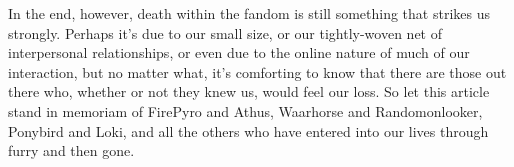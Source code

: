 In the end, however, death within the fandom is still something that strikes us strongly. Perhaps it's due to our small size, or our tightly-woven net of interpersonal relationships, or even due to the online nature of much of our interaction, but no matter what, it's comforting to know that there are those out there who, whether or not they knew us, would feel our loss. So let this article stand in memoriam of FirePyro and Athus, Waarhorse and Randomonlooker, Ponybird and Loki, and all the others who have entered into our lives through furry and then gone.
